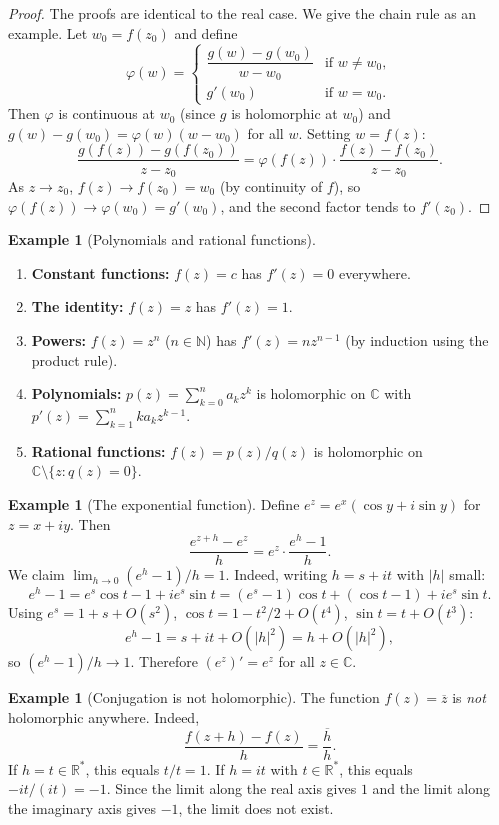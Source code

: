 \documentclass[12pt,a4paper,openany]{book}
\theoremstyle{definition}
\newtheorem{example}[definition]{Example}
\theoremstyle{plain}
\theoremstyle{remark}
\newcommand{\C}{\mathbb{C}}
\newcommand{\R}{\mathbb{R}}
\newcommand{\N}{\mathbb{N}}
\newcommand{\abs}[1]{\left|#1\right|}
\newcommand{\conj}[1]{\overline{#1}}
\begin{document}
\begin{proof}
The proofs are identical to the real case. We give the chain rule as an example. Let $w_0 = f(z_0)$ and define
\[
  \varphi(w) = \begin{cases} \dfrac{g(w)-g(w_0)}{w-w_0} & \text{if } w\neq w_0, \\ g'(w_0) & \text{if } w = w_0. \end{cases}
\]
Then $\varphi$ is continuous at $w_0$ (since $g$ is holomorphic at $w_0$) and $g(w)-g(w_0) = \varphi(w)(w-w_0)$ for all $w$. Setting $w = f(z)$:
\[
  \frac{g(f(z))-g(f(z_0))}{z-z_0} = \varphi(f(z))\cdot\frac{f(z)-f(z_0)}{z-z_0}.
\]
As $z\to z_0$, $f(z)\to f(z_0)=w_0$ (by continuity of $f$), so $\varphi(f(z))\to\varphi(w_0)=g'(w_0)$, and the second factor tends to $f'(z_0)$.
\end{proof}

\begin{example}[Polynomials and rational functions]
\label{ex:polynomials}
\leavevmode
\begin{enumerate}[label=\textup{(\roman*)}]
  \item \textbf{Constant functions:} $f(z)=c$ has $f'(z)=0$ everywhere.
  \item \textbf{The identity:} $f(z)=z$ has $f'(z)=1$.
  \item \textbf{Powers:} $f(z)=z^n$ ($n\in\N$) has $f'(z)=nz^{n-1}$ (by induction using the product rule).
  \item \textbf{Polynomials:} $p(z) = \sum_{k=0}^n a_k z^k$ is holomorphic on $\C$ with $p'(z) = \sum_{k=1}^n k a_k z^{k-1}$.
  \item \textbf{Rational functions:} $f(z)=p(z)/q(z)$ is holomorphic on $\C\setminus\{z:q(z)=0\}$.
\end{enumerate}
\end{example}

\begin{example}[The exponential function]
\label{ex:exponential}
Define $e^z = e^x(\cos y + i\sin y)$ for $z = x+iy$. Then
\[
  \frac{e^{z+h}-e^z}{h} = e^z\cdot\frac{e^h-1}{h}.
\]
We claim $\lim_{h\to 0}(e^h-1)/h = 1$. Indeed, writing $h = s+it$ with $\abs{h}$ small:
\[
  e^h - 1 = e^s\cos t - 1 + ie^s\sin t = (e^s-1)\cos t + (\cos t-1) + ie^s\sin t.
\]
Using $e^s = 1+s+O(s^2)$, $\cos t = 1 - t^2/2 + O(t^4)$, $\sin t = t+O(t^3)$:
\[
  e^h-1 = s + it + O(\abs{h}^2) = h + O(\abs{h}^2),
\]
so $(e^h-1)/h \to 1$. Therefore $(e^z)' = e^z$ for all $z\in\C$.
\end{example}

\begin{example}[Conjugation is not holomorphic]
\label{ex:conjugation-not-holo}
The function $f(z) = \conj{z}$ is \emph{not} holomorphic anywhere. Indeed,
\[
  \frac{f(z+h)-f(z)}{h} = \frac{\conj{h}}{h}.
\]
If $h = t\in\R^*$, this equals $t/t = 1$. If $h = it$ with $t\in\R^*$, this equals $-it/(it) = -1$. Since the limit along the real axis gives $1$ and the limit along the imaginary axis gives $-1$, the limit does not exist.
\end{example}
\end{document}
